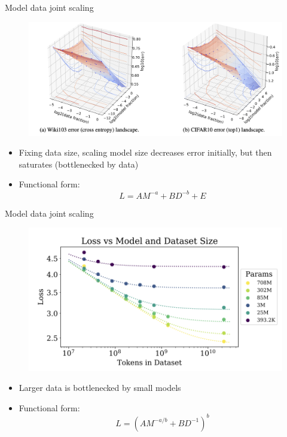 \documentclass[usenames,dvipsnames,notes,11pt,aspectratio=169,hyperref={colorlinks=true, linkcolor=blue}]{beamer}
\begin{document}
\begin{frame}
    {Model data joint scaling}
    \begin{figure}
        \includegraphics[height=0.5\textheight]{figures/data-model-loss-rosenfeld}
        \caption{}
    \end{figure}
    \begin{itemize}
        \item Fixing data size, scaling model size decreases error initially, but then saturates (bottlenecked by data)
        \item Functional form: 
    $$
    L = AM^{-a} + BD^{-b} + E
    $$
    \end{itemize}
\end{frame}

\begin{frame}
    {Model data joint scaling}

    \begin{figure}
        \includegraphics[height=0.5\textheight]{figures/data-model-loss-openai}
        \caption{}
    \end{figure}
    \begin{itemize}
        \item Larger data is bottlenecked by small models 
        \item Functional form: 
    $$
    L = (AM^{-a/b} + BD^{-1})^{b}
    $$
    \end{itemize}
\end{frame}
\end{document}
